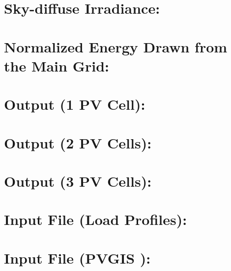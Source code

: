 		\section*{Sky-diffuse Irradiance:}
		

	  \section*{Normalized Energy Drawn from the Main Grid:}
		
		
		\section*{Output (1 PV Cell):}
		
		
		\section*{Output (2 PV Cells):}
		
		
		\section*{Output (3 PV Cells):}
		
		
		\section*{Input File (Load Profiles):}
		
		
		\section*{Input File (PVGIS \cite{PVGIS}):}
		
